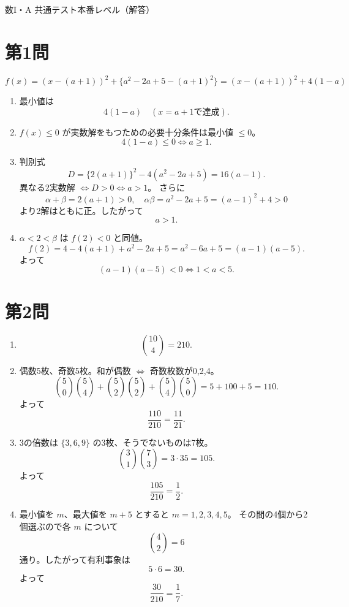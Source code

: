\documentclass[a4paper,12pt]{jsarticle}
\begin{document}
\begin{center}
{\LARGE 数I・A 共通テスト本番レベル（解答）}
\end{center}

\vspace{1em}

\section*{第1問}
\[
f(x)=(x-(a+1))^2+\{a^2-2a+5-(a+1)^2\}=(x-(a+1))^2+4(1-a)
\]
\begin{enumerate}[label=\arabic*.]
  \item 最小値は
  \[
  4(1-a)\quad (x=a+1 \text{で達成}).
  \]
  \item \(f(x)\le0\) が実数解をもつための必要十分条件は最小値 \(\le0\)。
  \[
  4(1-a)\le0 \iff a\ge1.
  \]
  \item 判別式
  \[
  D=\{2(a+1)\}^2-4(a^2-2a+5)=16(a-1).
  \]
  異なる2実数解 \(\iff D>0 \iff a>1\)。  
  さらに
  \[
  \alpha+\beta=2(a+1)>0,\quad \alpha\beta=a^2-2a+5=(a-1)^2+4>0
  \]
  より2解はともに正。したがって
  \[
  a>1.
  \]
  \item \(\alpha<2<\beta\) は \(f(2)<0\) と同値。
  \[
  f(2)=4-4(a+1)+a^2-2a+5=a^2-6a+5=(a-1)(a-5).
  \]
  よって
  \[
  (a-1)(a-5)<0 \iff 1<a<5.
  \]
\end{enumerate}

\section*{第2問}
\begin{enumerate}[label=\arabic*.]
  \item
  \[
  \binom{10}{4}=210.
  \]
  \item 偶数5枚、奇数5枚。和が偶数 \(\iff\) 奇数枚数が0,2,4。
  \[
  \binom{5}{0}\binom{5}{4}+\binom{5}{2}\binom{5}{2}+\binom{5}{4}\binom{5}{0}
  =5+100+5=110.
  \]
  よって
  \[
  \frac{110}{210}=\frac{11}{21}.
  \]
  \item 3の倍数は \(\{3,6,9\}\) の3枚、そうでないものは7枚。
  \[
  \binom{3}{1}\binom{7}{3}=3\cdot35=105.
  \]
  よって
  \[
  \frac{105}{210}=\frac12.
  \]
  \item 最小値を \(m\)、最大値を \(m+5\) とすると \(m=1,2,3,4,5\)。  
  その間の4個から2個選ぶので各 \(m\) について
  \[
  \binom{4}{2}=6
  \]
  通り。したがって有利事象は
  \[
  5\cdot6=30.
  \]
  よって
  \[
  \frac{30}{210}=\frac17.
  \]
\end{enumerate}
\end{document}
